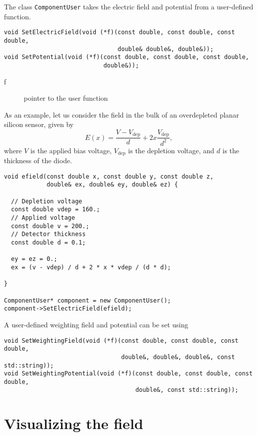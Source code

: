 The class \texttt{ComponentUser} takes the electric field and potential
from a user-defined function.
\begin{lstlisting}
void SetElectricField(void (*f)(const double, const double, const double, 
                                double& double&, double&));
void SetPotential(void (*f)(const double, const double, const double, 
                            double&));
\end{lstlisting}
\begin{description}
  \item[f] pointer to the user function
\end{description}

As an example, let us consider the field in the bulk of an overdepleted 
planar silicon sensor, given by
\begin{equation*}
E\left(x\right) = \frac{V - V_{\text{dep}}}{d} + 
                    2x \frac{V_{\text{dep}}}{d^{2}},
\end{equation*}
where \(V\) is the applied bias voltage, \(V_{\text{dep}}\) is 
the depletion voltage, and \(d\) is the thickness of the diode.
\begin{lstlisting}
void efield(const double x, const double y, const double z,
            double& ex, double& ey, double& ez) {

  // Depletion voltage
  const double vdep = 160.;
  // Applied voltage
  const double v = 200.;
  // Detector thickness
  const double d = 0.1;

  ey = ez = 0.;
  ex = (v - vdep) / d + 2 * x * vdep / (d * d);

}

ComponentUser* component = new ComponentUser();
component->SetElectricField(efield);

\end{lstlisting}

A user-defined weighting field and potential can be set using
\begin{lstlisting}
void SetWeightingField(void (*f)(const double, const double, const double,
                                 double&, double&, double&, const std::string));
void SetWeightingPotential(void (*f)(const double, const double, const double,
                                     double&, const std::string));
\end{lstlisting}

\section{Visualizing the field}

